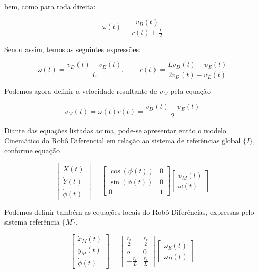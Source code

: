 \noindent bem, como para roda direita:

\begin{equation}
    \omega(t) = \frac{v_{D}(t)}{r(t) + \frac{L}{2}}
\end{equation}

Sendo assim, temos as seguintes expressões:

\begin{equation}
    \omega(t) = \frac{v_{D}(t) - v_{E}(t)}{L}, \quad\quad r(t) = \frac{Lv_{D}(t) + v_{E}(t)}{2v_{D}(t) - v_{E}(t)}
\end{equation}

Podemos agora definir a velocidade resultante de $v_M$ pela equação

\begin{equation}
    v_M (t) = \omega(t) r(t) = \frac{v_{D}(t) + v_{E}(t)}{2}
\end{equation}

Diante das equações listadas acima, pode-se apresentar então o modelo Cinemático do Robô Diferencial em relação ao sistema de referências global $\{I\}$, conforme equação

\begin{equation}
    \begin{bmatrix}
        \dot{X}(t) \\ \dot{Y}(t) \\ \dot{\phi}(t)
    \end{bmatrix}
    =
    \begin{bmatrix}
        \cos(\phi(t)) & 0 \\
        \sin(\phi(t)) & 0 \\
        0             & 1
    \end{bmatrix}
    \begin{bmatrix}
        v_M(t) \\ \omega(t)
    \end{bmatrix}
\end{equation}

Podemos definir também as equações locais do Robô Diferências, expressas pelo sistema referência $\{M\}$.

\begin{equation}
    \begin{bmatrix}
        \dot{x}_M(t) \\ \dot{y}_M(t) \\ \dot{\phi}(t)
    \end{bmatrix}
    =
    \begin{bmatrix}
        \frac{r_r}{2} & \frac{r_r}{2} \\
        o & 0 \\
        -\frac{r_r}{L} & \frac{r_r}{L}
    \end{bmatrix}
    \begin{bmatrix}
        \omega_E(t) \\ \omega_D(t)
    \end{bmatrix}
\end{equation}



